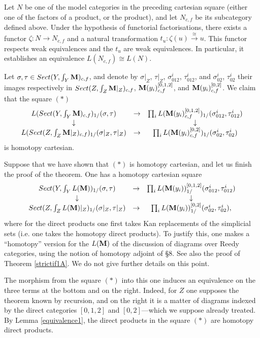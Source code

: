 Let $N$ be one of the model categories in the preceding cartesian square
(either one of the factors of a product, or the product), and let
$N_{c,f}$ be its subcategory defined above. Under the hypothesis of
functorial factorisations, there exists a functor $\zeta : N\rightarrow
N_{c,f}$ and a natural transformation $t_u: \zeta
(u)\stackrel{\cong}{\rightarrow} u$. This functor respects weak
equivalences and the $t_u$ are weak equivalences. In particular, it
establishes an equivalence $L(N_{c,f})\cong L(N)$.



Let $\sigma , \tau \in Sect (Y, \int _Y{\bf M} )_{c,f}$, and denote by
$\sigma |_Z$, $\tau |_Z$, $\sigma ^i_{012}$, $\tau ^i_{012}$, and $\sigma
^i_{02}$, $\tau ^i_{02}$ their images respectively in $Sect (Z,\int _Z{\bf M}
|_Z)_{c,f}$, ${\bf M} (y_i)^{[0,1,2]}_{c,f}$, and ${\bf M} (y_i)^{[0,2]}_{c,f}$. We
claim that the square $(\ast )$
$$
\begin{array}{ccc}
L(Sect (Y, \int _Y{\bf M} )_{c,f})_{1/}(\sigma , \tau )
&\rightarrow & \prod _i L({\bf M} (y_i)^{[0,1,2]}_{c,f})_{1/}(\sigma
^i_{012},\tau ^i
_{012})\\ \downarrow && \downarrow \\
L(Sect (Z, \int _Z{\bf M} |_Z)_{c,f})_{1/}(\sigma |_Z, \tau |_Z)
& \rightarrow & \prod _i L({\bf M} (y_i)^{[0,2]}_{c,f})_{1/}(\sigma ^i_{02},\tau
^i_{02}) \end{array}
$$
is homotopy cartesian.

Suppose that we have shown that $(\ast )$ is homotopy cartesian,
and let us finish the proof of the theorem.
One has a homotopy cartesian square
$$
\begin{array}{ccc}
Sect (Y, \int _Y L({\bf M} ))_{1/}(\sigma , \tau )
&\rightarrow & \prod _i L({\bf M} (y_i))^{[0,1,2]}_{1/}(\sigma ^i_{012},\tau ^i
_{012})\\ \downarrow && \downarrow \\
Sect (Z, \int _Z L({\bf M} )|_Z)_{1/}(\sigma |_Z, \tau |_Z)
& \rightarrow & \prod _i L({\bf M} (y_i))^{[0,2]}_{1/}(\sigma ^i_{02},\tau
^i_{02}), \end{array}
$$
where for the direct products one first takes Kan replacements of the
simplicial sets (i.e. one takes the homotopy direct products). To justify
this, one makes a ``homotopy'' version for the $L({\bf M} )$ of the
discussion of diagrams over Reedy categories, using the notion
of homotopy adjoint of \S 8. See also the proof of
Theorem \ref{strictif1A}. We do not give further
details
on this point.

The morphism from the square $(\ast )$ into this one
induces an equivalence on the three terms
at the bottom and on the right. Indeed, for $Z$ one supposes
the theorem
known by recursion, and on the right it is a matter of diagrams
indexed by the direct categories $[0,1,2]$ and $[0,2]$---which we
suppose
already treated.
By Lemma
\ref{equivalence1}, the direct products in the square $(\ast )$ are
homotopy direct products.

